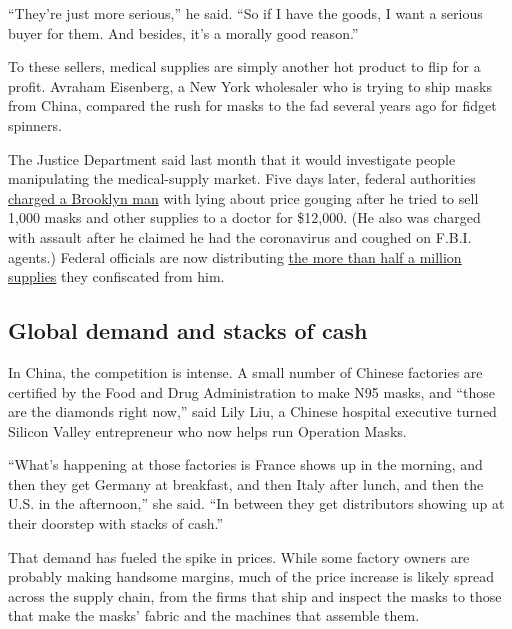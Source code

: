 ``They're just more serious,'' he said. ``So if I have the goods, I want
a serious buyer for them. And besides, it's a morally good reason.''

To these sellers, medical supplies are simply another hot product to
flip for a profit. Avraham Eisenberg, a New York wholesaler who is
trying to ship masks from China, compared the rush for masks to the fad
several years ago for fidget spinners.

The Justice Department said last month that it would investigate people
manipulating the medical-supply market. Five days later, federal
authorities
\href{https://www.bloomberg.com/news/articles/2020-03-30/suspected-mask-profiteer-arrested-for-coughing-on-fbi-agents}{charged
a Brooklyn man} with lying about price gouging after he tried to sell
1,000 masks and other supplies to a doctor for \$12,000. (He also was
charged with assault after he claimed he had the coronavirus and coughed
on F.B.I. agents.) Federal officials are now distributing
\href{https://www.hhs.gov/about/news/2020/04/02/doj-and-hhs-partner-to-distribute-more-than-half-a-million-medical-supplies-confiscated-from-price-gougers.html}{the
more than half a million supplies} they confiscated from him.

\hypertarget{global-demand-and-stacks-of-cash}{%
\subsection{Global demand and stacks of
cash}\label{global-demand-and-stacks-of-cash}}

In China, the competition is intense. A small number of Chinese
factories are certified by the Food and Drug Administration to make N95
masks, and ``those are the diamonds right now,'' said Lily Liu, a
Chinese hospital executive turned Silicon Valley entrepreneur who now
helps run Operation Masks.

``What's happening at those factories is France shows up in the morning,
and then they get Germany at breakfast, and then Italy after lunch, and
then the U.S. in the afternoon,'' she said. ``In between they get
distributors showing up at their doorstep with stacks of cash.''

That demand has fueled the spike in prices. While some factory owners
are probably making handsome margins, much of the price increase is
likely spread across the supply chain, from the firms that ship and
inspect the masks to those that make the masks' fabric and the machines
that assemble them.

